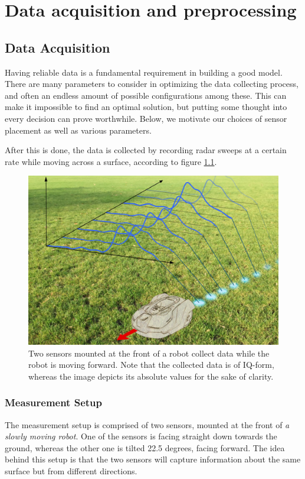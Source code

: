 \chapter{Data acquisition and preprocessing}
\section{Data Acquisition}
Having reliable data is a fundamental requirement in building a good model. There are many parameters to consider in optimizing the data collecting process, and often an endless amount of possible configurations among these. This can make it impossible to find an optimal solution, but putting some thought into every decision can prove worthwhile. Below, we motivate our choices of sensor placement as well as various parameters.

After this is done, the data is collected by recording radar sweeps at a certain rate while moving across a surface, according to figure \ref{fig:data_collecting}.

\begin{figure}[h]
	\centering
	\includegraphics[scale=0.60]{figs_temp/data_collecting.jpg}
	\caption{Two sensors mounted at the front of a robot collect data while the robot is moving forward. Note that the collected data is of IQ-form, whereas the image depicts its absolute values for the sake of clarity.}
	\label{fig:data_collecting}
\end{figure}

\subsection*{Measurement Setup}
The measurement setup is comprised of two sensors, mounted at the front of \emph{a slowly moving robot}. One of the sensors is facing straight down towards the ground, whereas the other one is tilted 22.5 degrees, facing forward. The idea behind this setup is that the two sensors will capture information about the same surface but from different directions. 

